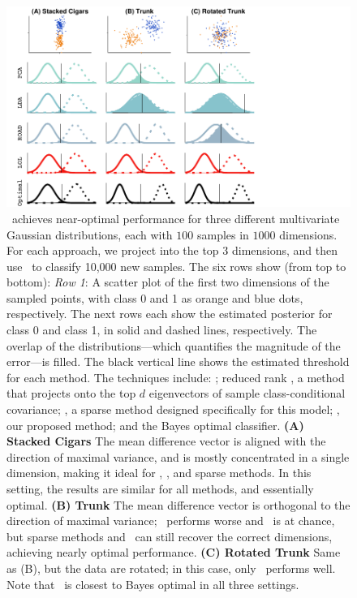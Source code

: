 \documentclass[11pt]{extarticle}
\begin{document}
\begin{figure}[h!]%
\centering
\includegraphics[width=0.8\linewidth,trim=0in 0in 1.5in 0in,clip=true]{cigars_est.pdf}%
\caption{
\Lol~achieves near-optimal performance for three different multivariate Gaussian distributions,
each with $100$ samples in $1000$ dimensions.
For each approach, we project into the top 3 dimensions, and then use \Lda~to classify 10,000 new samples.
The six rows show (from top to bottom):
\emph{Row 1}: A scatter plot of the first two dimensions of the sampled points, with class 0 and 1 as orange and blue dots, respectively.
The next rows each show the estimated posterior for class 0 and class 1, in solid and dashed lines, respectively. The overlap of the distributions---which quantifies the magnitude of the error---is filled.  The black vertical line shows the estimated threshold for each method.
The techniques include:
\Pca;
reduced rank \Lda, a method that projects onto the top $d$ eigenvectors of  sample class-conditional covariance;
\Road, a sparse method designed specifically for this model;
\Lol, our  proposed method; and
the Bayes optimal classifier.
%
\textbf{(A) Stacked Cigars} The mean difference vector is aligned with the direction of maximal variance, and is mostly concentrated in a single dimension, making it ideal for  \Pca, \Lda, and sparse methods.
In this setting, the results are  similar for all methods, and essentially optimal.
\textbf{(B) Trunk} The mean difference vector is orthogonal to the direction of maximal variance; \Pca~performs worse and \Lda~is at chance, but sparse methods and \Lol~can still recover the correct dimensions, achieving nearly optimal performance.
\textbf{(C) Rotated Trunk} Same as (B), but the data are rotated; in this case, only \Lol~performs well.
Note that \Lol~is closest to Bayes optimal in all three settings.
%
}
\label{f:cigars}
\end{figure}
\end{document}

